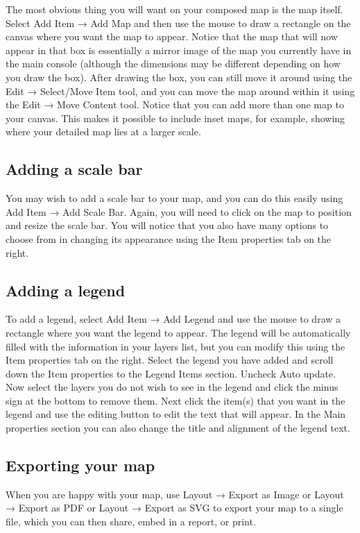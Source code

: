 \documentclass[]{book}
\begin{document}
The most obvious thing you will want on your composed map is the map itself. Select Add Item → Add Map and then use the mouse to draw a rectangle on the canvas where you want the map to appear. Notice that the map that will now appear in that box is essentially a mirror image of the map you currently have in the main console (although the dimensions may be different depending on how you draw the box). After drawing the box, you can still move it around using the Edit → Select/Move Item tool, and you can move the map around within it using the Edit → Move Content tool. Notice that you can add more than one map to your canvas. This makes it possible to include inset maps, for example, showing where your detailed map lies at a larger scale.

\hypertarget{adding-a-scale-bar}{%
\subsection{Adding a scale bar}\label{adding-a-scale-bar}}

You may wish to add a scale bar to your map, and you can do this easily using Add Item → Add Scale Bar. Again, you will need to click on the map to position and resize the scale bar. You will notice that you also have many options to choose from in changing its appearance using the Item properties tab on the right.

\hypertarget{adding-a-legend}{%
\subsection{Adding a legend}\label{adding-a-legend}}

To add a legend, select Add Item → Add Legend and use the mouse to draw a rectangle where you want the legend to appear. The legend will be automatically filled with the information in your layers list, but you can modify this using the Item properties tab on the right. Select the legend you have added and scroll down the Item properties to the Legend Items section. Uncheck Auto update. Now select the layers you do not wish to see in the legend and click the minus sign at the bottom to remove them. Next click the item(s) that you want in the legend and use the editing button to edit the text that will appear. In the Main properties section you can also change the title and alignment of the legend text.

\hypertarget{exporting-your-map}{%
\subsection{Exporting your map}\label{exporting-your-map}}

When you are happy with your map, use Layout → Export as Image or Layout → Export as PDF or Layout → Export as SVG to export your map to a single file, which you can then share, embed in a report, or print.


\end{document}

